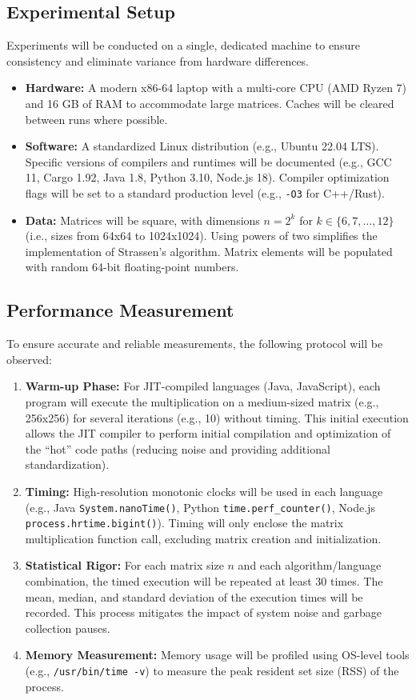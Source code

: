 \documentclass[11pt, a4paper, titlepage]{scrartcl}
\begin{document}
\subsection{Experimental Setup}
Experiments will be conducted on a single, dedicated machine to ensure consistency and eliminate variance from hardware differences.
\begin{itemize}
    \item \textbf{Hardware:} A modern x86-64 laptop with a multi-core CPU (AMD Ryzen 7) and 16 GB of RAM to accommodate large matrices. Caches will be cleared between runs where possible.
    \item \textbf{Software:} A standardized Linux distribution (e.g., Ubuntu 22.04 LTS). Specific versions of compilers and runtimes will be documented (e.g., GCC 11, Cargo 1.92, Java 1.8, Python 3.10, Node.js 18). Compiler optimization flags will be set to a standard production level (e.g., \texttt{-O3} for C++/Rust).
    \item \textbf{Data:} Matrices will be square, with dimensions \(n=2^k\) for \(k \in \{6, 7, \dots, 12\}\) (i.e., sizes from 64x64 to 1024x1024). Using powers of two simplifies the implementation of Strassen's algorithm. Matrix elements will be populated with random 64-bit floating-point numbers.
\end{itemize}

\subsection{Performance Measurement}
To ensure accurate and reliable measurements, the following protocol will be observed:
\begin{enumerate}
    \item \textbf{Warm-up Phase:} For JIT-compiled languages (Java, JavaScript), each program will execute the multiplication on a medium-sized matrix (e.g., 256x256) for several iterations (e.g., 10) without timing. This initial execution allows the JIT compiler to perform initial compilation and optimization of the ``hot'' code paths (reducing noise and providing additional standardization)\autocite{Lin2021}.
    \item \textbf{Timing:} High-resolution monotonic clocks will be used in each language (e.g., Java \texttt{System.nanoTime()}, Python \texttt{time.perf\_counter()}, Node.js \texttt{process.hrtime.bigint()}). Timing will only enclose the matrix multiplication function call, excluding matrix creation and initialization.
    \item \textbf{Statistical Rigor:} For each matrix size \(n\) and each algorithm/language combination, the timed execution will be repeated at least 30 times. The mean, median, and standard deviation of the execution times will be recorded. This process mitigates the impact of system noise and garbage collection pauses.
    \item \textbf{Memory Measurement:} Memory usage will be profiled using OS-level tools (e.g., \texttt{/usr/bin/time -v}) to measure the peak resident set size (RSS) of the process.
\end{enumerate}
\end{document}
